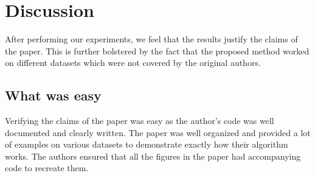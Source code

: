 \documentclass{article}
\begin{document}




\section{Discussion}


After performing our experiments, we feel that the results justify the claims of the paper. This is further bolstered by the fact that the proposed method worked on different datasets which were not covered by the original authors.


\subsection{What was easy}

Verifying the claims of the paper was easy as the author's code was well documented and clearly written. The paper was well organized and provided a lot of examples on various datasets to demonstrate exactly how their algorithm works. The authors ensured that all the figures in the paper had accompanying code to recreate them.
\end{document}
